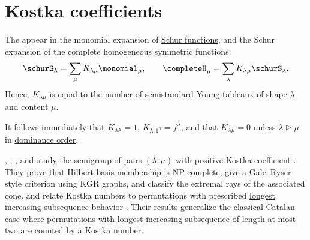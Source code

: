

\section[kostkaCoefficients]{Kostka coefficients}


The \label{kostkaCoefficient} appear in the
monomial expansion of \hyperref[schurS]{Schur functions}, and the Schur
expansion of the complete homogeneous symmetric functions:
\[
\schurS_\lambda = \sum_\mu K_{\lambda\mu} \monomial_\mu,
\qquad
\completeH_\mu = \sum_\lambda K_{\lambda\mu} \schurS_\lambda.
\]
Hence, $K_{\lambda\mu}$ is equal to the number of \hyperref[prelimTableaux]{semistandard Young tableaux}
of shape $\lambda$ and content $\mu$.

It follows immediately that $K_{\lambda\lambda}=1$,
$K_{\lambda,1^n} = f^{\lambda}$, and that $K_{\lambda\mu}=0$ unless
$\lambda \trianglerighteq \mu$
in \hyperref[partialOrderingsOnPartitions]{dominance order}.

, , , and
 study the semigroup of pairs $(\lambda,\mu)$ with
positive Kostka coefficient \cite{GaoKiersOrelowitzYong2024}.  They prove that
Hilbert-basis membership is NP-complete, give a Gale--Ryser style criterion
using KGR graphs, and classify the extremal rays of the associated cone.
 and  relate Kostka numbers to
permutations with prescribed \hyperref[rsk]{longest increasing subsequence}
behavior
\cite{KrishnanNeville2019x}.  Their results generalize the classical Catalan
case where permutations with longest increasing subsequence of length at most
two are counted by a Kostka number.


